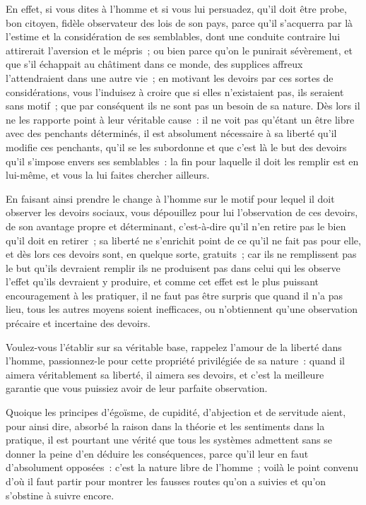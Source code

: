 \documentclass[french,twoside]{book} %
\begin{document}
En effet, si vous dites à l’homme et si vous lui persuadez, qu’il doit être probe, bon citoyen, fidèle observateur des lois de son pays, parce qu’il s’acquerra par là l’estime et la considération de ses semblables, dont une conduite contraire lui attirerait l’aversion et le mépris ; ou bien parce qu’on le punirait sévèrement, et que s’il échappait au châtiment dans ce monde, des supplices affreux l’attendraient dans une autre vie ; en motivant les devoirs par ces sortes de considérations, vous l’induisez à croire que si elles n’existaient pas, ils seraient sans motif ; que par conséquent ils ne sont pas un besoin de sa nature. Dès lors il ne les rapporte point à leur véritable cause : il ne voit pas qu’étant un être libre avec des penchants déterminés, il est absolument nécessaire à sa liberté qu’il modifie ces penchants, qu’il se les subordonne et que c’est là le but des devoirs qu’il s’impose envers ses semblables : la fin pour laquelle il doit les remplir est en lui-même, et vous la lui faites chercher ailleurs.\par
En faisant ainsi prendre le change à l’homme sur le motif pour lequel il doit observer les devoirs sociaux, vous dépouillez pour lui l’observation de ces devoirs, de son avantage propre et déterminant, c’est-à-dire qu’il n’en retire pas le bien qu’il doit en retirer ; sa liberté ne s’enrichit point de ce qu’il ne fait pas pour elle, et dès lors ces devoirs sont, en quelque sorte, gratuits ; car ils ne remplissent pas le but qu’ils devraient remplir ils ne produisent pas dans celui qui les observe l’effet qu’ils devraient y produire, et comme cet effet est le plus puissant encouragement à les pratiquer, il ne faut pas être surpris que quand il n’a pas lieu, tous les autres moyens soient inefficaces, ou n’obtiennent qu’une observation précaire et incertaine des devoirs.\par
Voulez-vous l’établir sur sa véritable base, rappelez l’amour de la liberté dans l’homme, passionnez-le pour cette propriété privilégiée de sa nature : quand il aimera véritablement sa liberté, il aimera ses devoirs, et c’est la meilleure garantie que vous puissiez avoir de leur parfaite observation.\par
Quoique les principes d’égoïsme, de cupidité, d’abjection et de servitude aient, pour ainsi dire, absorbé la raison dans la théorie et les sentiments dans la pratique, il est pourtant une vérité que tous les systèmes admettent sans se donner la peine d’en déduire les conséquences, parce qu’il leur en faut d’absolument opposées : c’est la nature libre de l’homme ; voilà le point convenu d’où il faut partir pour montrer les fausses routes qu’on a suivies et qu’on s’obstine à suivre encore.\par
\end{document}
